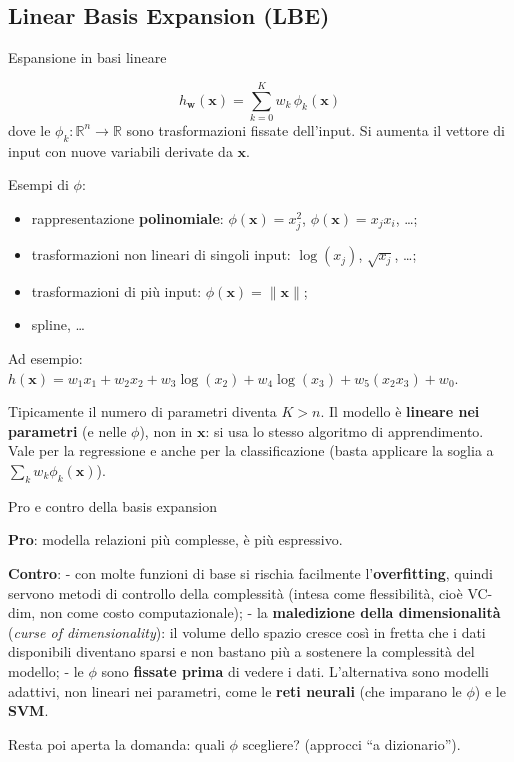 \subsection{Linear Basis Expansion
(LBE)}\label{linear-basis-expansion-lbe}

\begin{boxdefinition}{Espansione in basi lineare}

\[
h_\mathbf{w}(\mathbf{x}) = \sum_{k=0}^{K} w_k\, \phi_k(\mathbf{x})
\] dove le \(\phi_k: \mathbb{R}^n \to \mathbb{R}\) sono trasformazioni
fissate dell'input. Si aumenta il vettore di input con nuove variabili
derivate da \(\mathbf{x}\).

\end{boxdefinition}

Esempi di \(\phi\):

\begin{itemize}
\tightlist
\item
  rappresentazione \textbf{polinomiale}: \(\phi(\mathbf{x}) = x_j^2\),
  \(\phi(\mathbf{x}) = x_j x_i\), \ldots;
\item
  trasformazioni non lineari di singoli input: \(\log(x_j)\),
  \(\sqrt{x_j}\), \ldots;
\item
  trasformazioni di più input: \(\phi(\mathbf{x}) = \|\mathbf{x}\|\);
\item
  spline, \ldots{}
\end{itemize}

Ad esempio:
\(h(\mathbf{x}) = w_1x_1 + w_2x_2 + w_3\log(x_2) + w_4\log(x_3) + w_5(x_2x_3) + w_0\).

Tipicamente il numero di parametri diventa \(K > n\). Il modello è
\textbf{lineare nei parametri} (e nelle \(\phi\)), non in
\(\mathbf{x}\): si usa lo stesso algoritmo di apprendimento. Vale per la
regressione e anche per la classificazione (basta applicare la soglia a
\(\sum_k w_k\phi_k(\mathbf{x})\)).

\begin{boxwarning}{Pro e contro della basis expansion}

\textbf{Pro}: modella relazioni più complesse, è più espressivo.

\textbf{Contro}: - con molte funzioni di base si rischia facilmente
l'\textbf{overfitting}, quindi servono metodi di controllo della
complessità (intesa come flessibilità, cioè VC-dim, non come costo
computazionale); - la \textbf{maledizione della dimensionalità}
(\emph{curse of dimensionality}): il volume dello spazio cresce così in
fretta che i dati disponibili diventano sparsi e non bastano più a
sostenere la complessità del modello; - le \(\phi\) sono \textbf{fissate
prima} di vedere i dati. L'alternativa sono modelli adattivi, non
lineari nei parametri, come le \textbf{reti neurali} (che imparano le
\(\phi\)) e le \textbf{SVM}.

Resta poi aperta la domanda: quali \(\phi\) scegliere? (approcci ``a
dizionario'').

\end{boxwarning}

